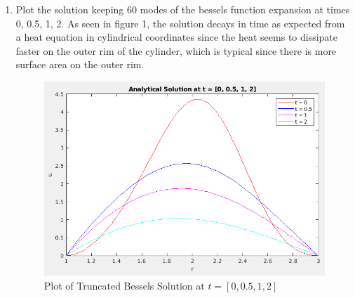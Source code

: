 \documentclass{article}
\begin{document}
\begin{enumerate}[label=\alph*)]

    \item Plot the solution keeping 60 modes of the bessels function expansion
    at times 0, 0.5, 1, 2. As seen in figure 1, the solution decays in time as
    expected from a heat equation in cylindrical coordinates since the heat
    seems to dissipate faster on the outer rim of the cylinder, which is typical
    since there is more surface area on the outer rim. 
    \begin{figure}[ht]
        \centering
        \includegraphics[width=.8\textwidth]{ua_t.png}
        \caption{Plot of Truncated Bessels Solution at $t = [0,0.5,1,2]$}
    \end{figure}


\end{enumerate}
\end{document}
